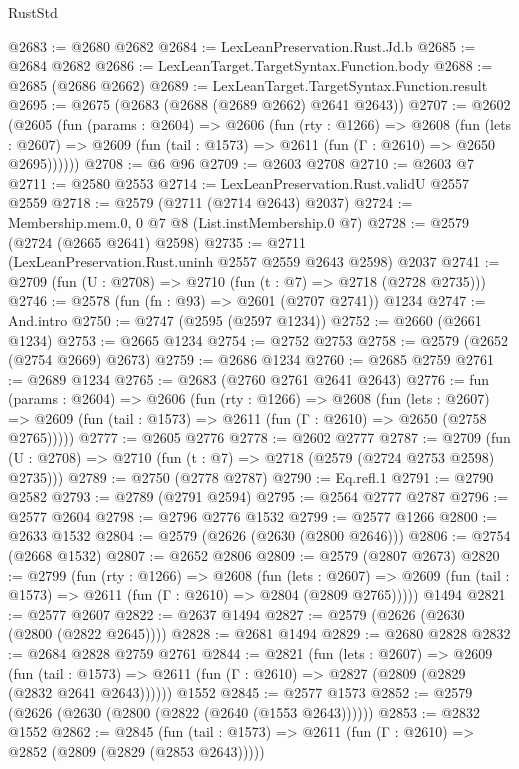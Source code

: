\begin{lexlean}{RustStd}
\begin{coremodule}
@2683 := @2680 @2682
@2684 := LexLeanPreservation.Rust.Jd.b
@2685 := @2684 @2682
@2686 := LexLeanTarget.TargetSyntax.Function.body
@2688 := @2685 (@2686 @2662)
@2689 := LexLeanTarget.TargetSyntax.Function.result
@2695 := @2675 (@2683 (@2688 (@2689 @2662) @2641 @2643))
@2707 := @2602
    (@2605
      (fun (params : @2604) =>
      @2606
        (fun (rty : @1266) =>
        @2608
          (fun (lets : @2607) =>
          @2609 (fun (tail : @1573) => @2611 (fun (Γ : @2610) => @2650 @2695))))))
@2708 := @6 @96
@2709 := @2603 @2708
@2710 := @2603 @7
@2711 := @2580 @2553
@2714 := LexLeanPreservation.Rust.validU @2557 @2559
@2718 := @2579 (@2711 (@2714 @2643) @2037)
@2724 := Membership.mem.{0, 0} @7 @8 (List.instMembership.{0} @7)
@2728 := @2579 (@2724 (@2665 @2641) @2598)
@2735 := @2711 (LexLeanPreservation.Rust.uninh @2557 @2559 @2643 @2598) @2037
@2741 := @2709 (fun (U : @2708) => @2710 (fun (t : @7) => @2718 (@2728 @2735)))
@2746 := @2578 (fun (fn : @93) => @2601 (@2707 @2741)) @1234
@2747 := And.intro
@2750 := @2747 (@2595 (@2597 @1234))
@2752 := @2660 (@2661 @1234)
@2753 := @2665 @1234
@2754 := @2752 @2753
@2758 := @2579 (@2652 (@2754 @2669) @2673)
@2759 := @2686 @1234
@2760 := @2685 @2759
@2761 := @2689 @1234
@2765 := @2683 (@2760 @2761 @2641 @2643)
@2776 := fun (params : @2604) =>
  @2606
    (fun (rty : @1266) =>
    @2608
      (fun (lets : @2607) =>
      @2609 (fun (tail : @1573) => @2611 (fun (Γ : @2610) => @2650 (@2758 @2765)))))
@2777 := @2605 @2776
@2778 := @2602 @2777
@2787 := @2709 (fun (U : @2708) => @2710 (fun (t : @7) => @2718 (@2579 (@2724 @2753 @2598) @2735)))
@2789 := @2750 (@2778 @2787)
@2790 := Eq.refl.{1}
@2791 := @2790 @2582
@2793 := @2789 (@2791 @2594)
@2795 := @2564 @2777 @2787
@2796 := @2577 @2604
@2798 := @2796 @2776 @1532
@2799 := @2577 @1266
@2800 := @2633 @1532
@2804 := @2579 (@2626 (@2630 (@2800 @2646)))
@2806 := @2754 (@2668 @1532)
@2807 := @2652 @2806
@2809 := @2579 (@2807 @2673)
@2820 := @2799
    (fun (rty : @1266) =>
    @2608
      (fun (lets : @2607) =>
      @2609 (fun (tail : @1573) => @2611 (fun (Γ : @2610) => @2804 (@2809 @2765)))))
    @1494
@2821 := @2577 @2607
@2822 := @2637 @1494
@2827 := @2579 (@2626 (@2630 (@2800 (@2822 @2645))))
@2828 := @2681 @1494
@2829 := @2680 @2828
@2832 := @2684 @2828 @2759 @2761
@2844 := @2821
    (fun (lets : @2607) =>
    @2609
      (fun (tail : @1573) => @2611 (fun (Γ : @2610) => @2827 (@2809 (@2829 (@2832 @2641 @2643))))))
    @1552
@2845 := @2577 @1573
@2852 := @2579 (@2626 (@2630 (@2800 (@2822 (@2640 (@1553 @2643))))))
@2853 := @2832 @1552
@2862 := @2845
    (fun (tail : @1573) => @2611 (fun (Γ : @2610) => @2852 (@2809 (@2829 (@2853 @2643)))))

\end{coremodule}
\end{lexlean}
